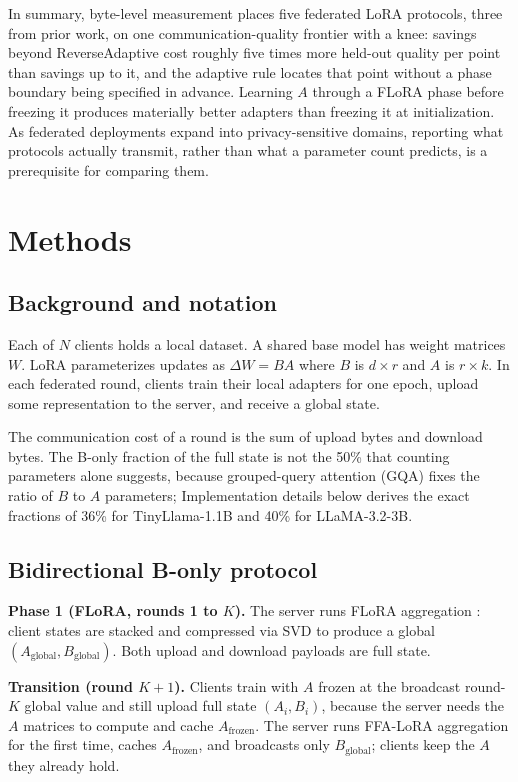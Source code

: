 \documentclass[pdflatex,sn-nature,lineno]{sn-jnl}
\begin{document}
\label{sec:conclusion}
In summary, byte-level measurement places five federated LoRA protocols, three from prior work, on one communication-quality frontier with a knee: savings beyond ReverseAdaptive cost roughly five times more held-out quality per point than savings up to it, and the adaptive rule locates that point without a phase boundary being specified in advance. Learning $A$ through a FLoRA phase before freezing it produces materially better adapters than freezing it at initialization. As federated deployments expand into privacy-sensitive domains, reporting what protocols actually transmit, rather than what a parameter count predicts, is a prerequisite for comparing them.

\section{Methods}
\label{sec:method}

\subsection{Background and notation}
Each of $N$ clients holds a local dataset. A shared base model has weight matrices $W$. LoRA \cite{hu2022lora} parameterizes updates as $\Delta W = BA$ where $B$ is $d \times r$ and $A$ is $r \times k$. In each federated round, clients train their local adapters for one epoch, upload some representation to the server, and receive a global state.

The communication cost of a round is the sum of upload bytes and download bytes. The B-only fraction of the full state is not the 50\% that counting parameters alone suggests, because grouped-query attention (GQA) fixes the ratio of $B$ to $A$ parameters; Implementation details below derives the exact fractions of 36\% for TinyLlama-1.1B and 40\% for LLaMA-3.2-3B.

\subsection{Bidirectional B-only protocol}
\textbf{Phase 1 (FLoRA, rounds 1 to $K$).}
The server runs FLoRA aggregation \cite{wang2024flora}: client states are stacked and compressed via SVD to produce a global $(A_{\text{global}}, B_{\text{global}})$. Both upload and download payloads are full state.

\textbf{Transition (round $K{+}1$).}
Clients train with $A$ frozen at the broadcast round-$K$ global value and still upload full state $(A_i, B_i)$, because the server needs the $A$ matrices to compute and cache $A_{\text{frozen}}$. The server runs FFA-LoRA \cite{sun2024ffalora} aggregation for the first time, caches $A_{\text{frozen}}$, and broadcasts only $B_{\text{global}}$; clients keep the $A$ they already hold.
\end{document}
